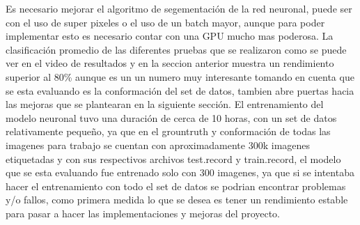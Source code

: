 \documentclass[conference]{IEEEtran}
\begin{document}
Es necesario mejorar el algoritmo de segementaci\'on de la red neuronal, puede ser con el uso de super pixeles o el uso de un batch mayor, aunque para poder implementar esto es necesario contar con una GPU mucho mas poderosa.
La clasificaci\'on promedio de las diferentes pruebas que se realizaron como se puede ver en el video de resultados y en la seccion anterior muestra un rendimiento superior al 80\% aunque es un un numero muy interesante tomando en cuenta que se esta evaluando es la conformaci\'on del set de datos, tambien abre puertas hacia las mejoras que se plantearan en la siguiente secci\'on.
El entrenamiento del modelo neuronal tuvo una duraci\'on de cerca de 10 horas, con un set de datos relativamente pequeño, ya que en el grountruth y conformaci\'on de todas las imagenes para trabajo se cuentan con aproximadamente 300k imagenes etiquetadas y con sus respectivos archivos test.record y train.record, el modelo que se esta evaluando fue entrenado solo con 300 imagenes, ya que si se intentaba hacer el entrenamiento con todo el set de datos se podrian encontrar problemas y/o fallos, como primera medida lo que se desea es tener un rendimiento estable para pasar a hacer las implementaciones y mejoras del proyecto.
\end{document}
